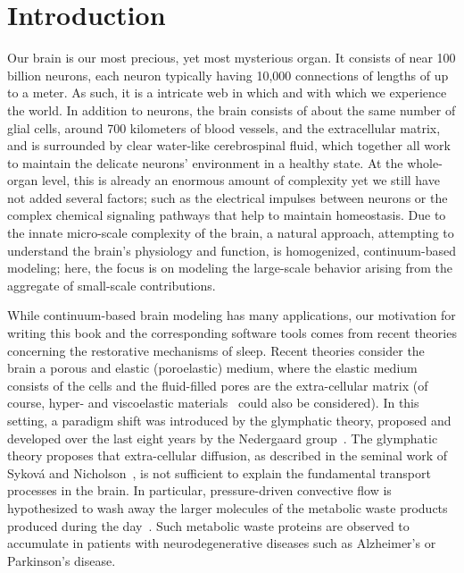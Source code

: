 \chapter{Introduction}
\label{chp:chp1}

Our brain is our most precious, yet most mysterious organ. It consists
of near 100 billion neurons, each neuron typically having 10,000 connections
of lengths of up to a meter. As such, it is a intricate web in which
and with which we experience the world. In addition to neurons,
the brain consists of about the same number of glial cells, around 700
kilometers of blood vessels, and the extracellular matrix, and is
surrounded by clear water-like cerebrospinal fluid, which
together all work to maintain the delicate neurons' environment in a
healthy state. At the whole-organ level, this is already an enormous amount of 
complexity yet we still have not added several factors; such as the electrical 
impulses between neurons or the complex chemical signaling pathways that help 
to maintain homeostasis.  Due to the innate micro-scale complexity of the brain,  
a natural approach, attempting to understand the brain's physiology
and function, is homogenized, continuum-based modeling;  here, the 
focus is on modeling the large-scale behavior arising from the aggregate of 
small-scale contributions. 

While continuum-based brain modeling has many applications, our
motivation for writing this book and the corresponding software tools
comes from recent theories concerning the restorative mechanisms of
sleep. Recent theories consider the brain a porous and elastic
(poroelastic) medium, where the elastic medium consists of the cells
and the fluid-filled pores are the extra-cellular matrix (of course, 
hyper- and viscoelastic materials~\cite{goriely2015mechanics,
  budday2019fifty} could also be considered). In this setting, a
paradigm shift was introduced by the glymphatic theory, proposed and
developed over the last eight years by the Nedergaard
group~\cite{iliff2012paravascular}. The glymphatic theory proposes
that extra-cellular diffusion, as described in the seminal work of
Sykov{\'a} and Nicholson~\cite{sykova2008diffusion}, is not sufficient
to explain the fundamental transport processes in the brain. In
particular, pressure-driven convective flow is hypothesized to wash
away the larger molecules of the metabolic waste products produced
during the day~\cite{iliff2012paravascular, jessen2015glymphatic,
  xie2013sleep}. Such metabolic waste proteins are observed to
accumulate in patients with neurodegenerative diseases such as
Alzheimer's or Parkinson's disease.

